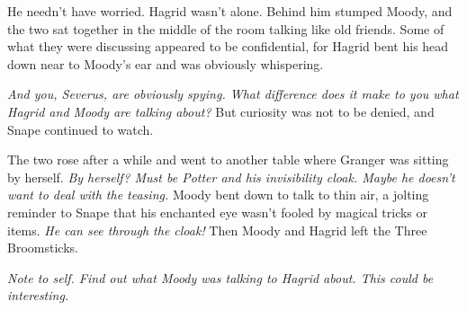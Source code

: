He needn't have worried. Hagrid wasn't alone. Behind him stumped Moody, and the two sat together in the middle of the room talking like old friends. Some of what they were discussing appeared to be confidential, for Hagrid bent his head down near to Moody's ear and was obviously whispering.

\emph{And you, Severus, are obviously spying. What difference does it make to you what Hagrid and Moody are talking about?} But curiosity was not to be denied, and Snape continued to watch.

The two rose after a while and went to another table where Granger was sitting by herself. \emph{By herself? Must be Potter and his invisibility cloak. Maybe he doesn't want to deal with the teasing.} Moody bent down to talk to thin air, a jolting reminder to Snape that his enchanted eye wasn't fooled by magical tricks or items. \emph{He can see through the cloak!} Then Moody and Hagrid left the Three Broomsticks.

\emph{Note to self. Find out what Moody was talking to Hagrid about. This could be interesting.}



